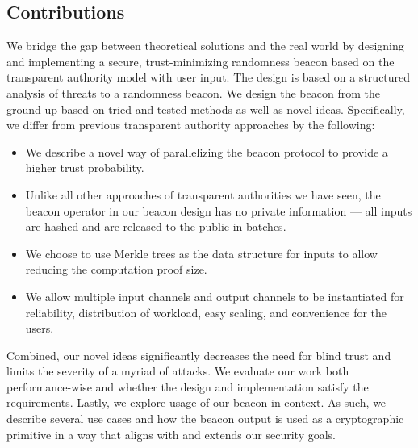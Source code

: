 \subsection{Contributions}
We bridge the gap between theoretical solutions and the real world by designing and implementing a secure, trust-minimizing randomness beacon based on the transparent authority model with user input.
The design is based on a structured analysis of threats to a randomness beacon.
We design the beacon from the ground up based on tried and tested methods as well as novel ideas.
Specifically, we differ from previous transparent authority approaches by the following:
\begin{itemize}
    \item We describe a novel way of parallelizing the beacon protocol to provide a higher trust probability.
    \item Unlike all other approaches of transparent authorities we have seen, the beacon operator in our beacon design has no private information --- all inputs are hashed and are released to the public in batches.
    \item We choose to use Merkle trees as the data structure for inputs to allow reducing the computation proof size.
    \item We allow multiple input channels and output channels to be instantiated for reliability, distribution of workload, easy scaling, and convenience for the users.
\end{itemize}
Combined, our novel ideas significantly decreases the need for blind trust and limits the severity of a myriad of attacks.
We evaluate our work both performance-wise and whether the design and implementation satisfy the requirements.
Lastly, we explore usage of our beacon in context. As such, we describe several use cases and how the beacon output is used as a cryptographic primitive in a way that aligns with and extends our security goals.
